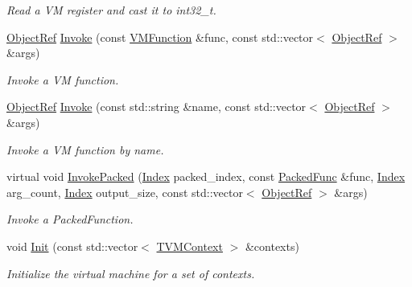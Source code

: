 \begin{DoxyCompactItemize}
\begin{DoxyCompactList}\small\item\em Read a VM register and cast it to int32\+\_\+t. \end{DoxyCompactList}\item 
\hyperlink{classtvm_1_1runtime_1_1ObjectRef}{Object\+Ref} \hyperlink{classtvm_1_1runtime_1_1vm_1_1VirtualMachine_aa5f4724e2e702ef9d5c34e85dec53b02}{Invoke} (const \hyperlink{structtvm_1_1runtime_1_1vm_1_1VMFunction}{V\+M\+Function} \&func, const std\+::vector$<$ \hyperlink{classtvm_1_1runtime_1_1ObjectRef}{Object\+Ref} $>$ \&args)
\begin{DoxyCompactList}\small\item\em Invoke a VM function. \end{DoxyCompactList}\item 
\hyperlink{classtvm_1_1runtime_1_1ObjectRef}{Object\+Ref} \hyperlink{classtvm_1_1runtime_1_1vm_1_1VirtualMachine_a1094291352e07e4c827a88b1167b89ad}{Invoke} (const std\+::string \&name, const std\+::vector$<$ \hyperlink{classtvm_1_1runtime_1_1ObjectRef}{Object\+Ref} $>$ \&args)
\begin{DoxyCompactList}\small\item\em Invoke a VM function by name. \end{DoxyCompactList}\item 
virtual void \hyperlink{classtvm_1_1runtime_1_1vm_1_1VirtualMachine_a89bc186467de25e51802e0ce739f436b}{Invoke\+Packed} (\hyperlink{namespacetvm_1_1runtime_1_1vm_a3597867d2db714bf760876a23d6b7d3d}{Index} packed\+\_\+index, const \hyperlink{classtvm_1_1runtime_1_1PackedFunc}{Packed\+Func} \&func, \hyperlink{namespacetvm_1_1runtime_1_1vm_a3597867d2db714bf760876a23d6b7d3d}{Index} arg\+\_\+count, \hyperlink{namespacetvm_1_1runtime_1_1vm_a3597867d2db714bf760876a23d6b7d3d}{Index} output\+\_\+size, const std\+::vector$<$ \hyperlink{classtvm_1_1runtime_1_1ObjectRef}{Object\+Ref} $>$ \&args)
\begin{DoxyCompactList}\small\item\em Invoke a Packed\+Function. \end{DoxyCompactList}\item 
void \hyperlink{classtvm_1_1runtime_1_1vm_1_1VirtualMachine_ade6ed373d6af91fe813f6f98f9e59244}{Init} (const std\+::vector$<$ \hyperlink{c__runtime__api_8h_a9363bb701f16ce5bbb381f2a013d25b4}{T\+V\+M\+Context} $>$ \&contexts)
\begin{DoxyCompactList}\small\item\em Initialize the virtual machine for a set of contexts. \end{DoxyCompactList}\item 

\end{DoxyCompactItemize}
